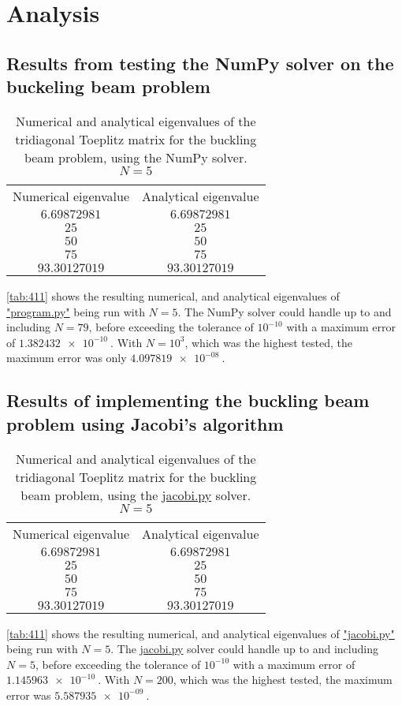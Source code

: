 \documentclass[english,notitlepage,reprint]{revtex4-1}  %
\begin{document}
\section{Analysis}\label{sec:4}
\subsection{Results from testing the NumPy solver on the buckeling beam problem}\label{subsec:41}
\begin{table}[H]
	\label{tab:411}
	\centering
	\begin{tabular}{|c|c|}
	Numerical eigenvalue & Analytical eigenvalue \\
	\(6.69872981\)	& \(6.69872981\) \\
	\(25\) & \(25\) \\
	\(50\) & \(50\) \\
	\(75\) & \(75\) \\
	\(93.30127019\) & \(93.30127019\) \\
	\end{tabular}
	\caption{Numerical and analytical eigenvalues of the tridiagonal Toeplitz matrix for
	the buckling beam problem, using the NumPy solver. \(N=5\)}
\end{table}

\autoref{tab:411} shows the resulting numerical, and analytical eigenvalues of \hyperref[A:1]{"program.py"} being run with \(N=5\). The NumPy solver could handle up to and including \(N=79\), before exceeding the tolerance of \(10^{-10}\) with a maximum error of \(\SI{1.382432e-10}{}\). With \(N=10^{3}\), which was the highest tested, the maximum error was only \(\SI{4.097819e-08}{}\).

\subsection{Results of implementing the buckling beam problem using Jacobi's algorithm}\label{subsec:42}
\begin{table}[H]
	\label{tab:421}
	\centering
	\begin{tabular}{|c|c|}
	Numerical eigenvalue & Analytical eigenvalue \\
	\(6.69872981\)	& \(6.69872981\) \\
	\(25\) & \(25\) \\
	\(50\) & \(50\) \\
	\(75\) & \(75\) \\
	\(93.30127019\) & \(93.30127019\) \\
	\end{tabular}
	\caption{Numerical and analytical eigenvalues of the tridiagonal Toeplitz matrix for
	the buckling beam problem, using the \hyperref[A:2]{jacobi.py} solver. \(N=5\)}
\end{table}
\autoref{tab:411} shows the resulting numerical, and analytical eigenvalues of \hyperref[A:2]{"jacobi.py"} being run with \(N=5\). The \hyperref[A:2]{jacobi.py} solver could handle up to and including \(N=5\), before exceeding the tolerance of \(10^{-10}\) with a maximum error of \(\SI{1.145963e-10}{}\). With \(N=200\), which was the highest tested, the maximum error was \(\SI{5.587935e-09}{}\).
\end{document}
